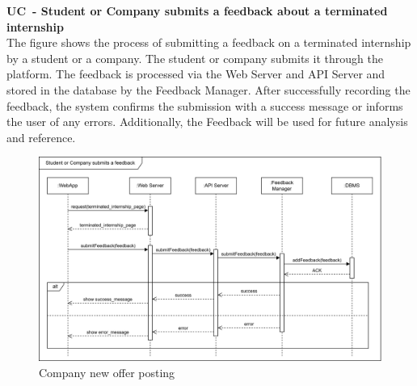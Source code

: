 \textbf{UC\cuc\  - Student or Company submits a feedback about a terminated internship} \\
The figure shows the process of submitting a feedback on a terminated internship by a student or a company. The student or company submits it through the platform. The feedback is processed via the Web Server and API Server and stored in the database by the Feedback Manager. After successfully recording the feedback, the system confirms the submission with a success message or informs the user of any errors. Additionally, the Feedback will be used for future analysis and reference.
\begin{center}
    \begin{figure}[H]
        \centering
        \includegraphics[width=1\linewidth]{Images/Sequence diagrams/UC15.png}
        \caption{Company new offer posting}
        \label{fig:enter-label}
    \end{figure}
\end{center}


